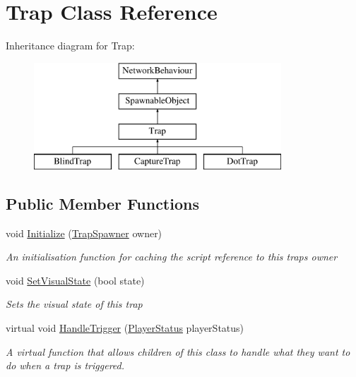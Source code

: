 \hypertarget{class_trap}{}\section{Trap Class Reference}
\label{class_trap}
Inheritance diagram for Trap\+:\begin{figure}[H]
\begin{center}
\leavevmode
\includegraphics[height=4.000000cm]{class_trap}
\end{center}
\end{figure}
\subsection*{Public Member Functions}
\begin{DoxyCompactItemize}
\item 
void \hyperlink{class_trap_a216acede3b7c562aaed5255bb33f6f98}{Initialize} (\hyperlink{class_trap_spawner}{Trap\+Spawner} owner)
\begin{DoxyCompactList}\small\item\em An initialisation function for caching the script reference to this trap\textquotesingle{}s owner \end{DoxyCompactList}\item 
void \hyperlink{class_trap_a432fa6ae980bb74cac0c7b95eb9b1d7e}{Set\+Visual\+State} (bool state)
\begin{DoxyCompactList}\small\item\em Sets the visual state of this trap \end{DoxyCompactList}\item 
virtual void \hyperlink{class_trap_a2e92a6f420a5d21a132108d8dd3ca5de}{Handle\+Trigger} (\hyperlink{class_player_status}{Player\+Status} player\+Status)
\begin{DoxyCompactList}\small\item\em A virtual function that allows children of this class to handle what they want to do when a trap is triggered. \end{DoxyCompactList}\end{DoxyCompactItemize}
